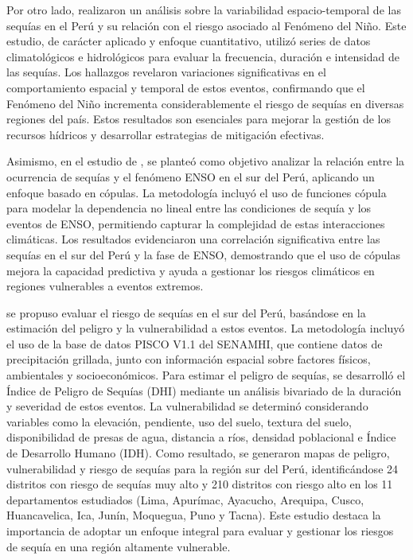 Por otro lado, \textcite{Cabrera2021} realizaron un análisis sobre la variabilidad espacio-temporal de las sequías en el Perú y su relación con el riesgo asociado al Fenómeno del Niño. Este estudio, de carácter aplicado y enfoque cuantitativo, utilizó series de datos climatológicos e hidrológicos para evaluar la frecuencia, duración e intensidad de las sequías. Los hallazgos revelaron variaciones significativas en el comportamiento espacial y temporal de estos eventos, confirmando que el Fenómeno del Niño incrementa considerablemente el riesgo de sequías en diversas regiones del país. Estos resultados son esenciales para mejorar la gestión de los recursos hídricos y desarrollar estrategias de mitigación efectivas.

Asimismo, en el estudio de \textcite{Cabrera2019}, se planteó como objetivo analizar la relación entre la ocurrencia de sequías y el fenómeno ENSO en el sur del Perú, aplicando un enfoque basado en cópulas. La metodología incluyó el uso de funciones cópula para modelar la dependencia no lineal entre las condiciones de sequía y los eventos de ENSO, permitiendo capturar la complejidad de estas interacciones climáticas. Los resultados evidenciaron una correlación significativa entre las sequías en el sur del Perú y la fase de ENSO, demostrando que el uso de cópulas mejora la capacidad predictiva y ayuda a gestionar los riesgos climáticos en regiones vulnerables a eventos extremos.

\textcite{Vega2016} se propuso evaluar el riesgo de sequías en el sur del Perú, basándose en la estimación del peligro y la vulnerabilidad a estos eventos. La metodología incluyó el uso de la base de datos PISCO V1.1 del SENAMHI, que contiene datos de precipitación grillada, junto con información espacial sobre factores físicos, ambientales y socioeconómicos. Para estimar el peligro de sequías, se desarrolló el Índice de Peligro de Sequías (DHI) mediante un análisis bivariado de la duración y severidad de estos eventos. La vulnerabilidad se determinó considerando variables como la elevación, pendiente, uso del suelo, textura del suelo, disponibilidad de presas de agua, distancia a ríos, densidad poblacional e Índice de Desarrollo Humano (IDH). Como resultado, se generaron mapas de peligro, vulnerabilidad y riesgo de sequías para la región sur del Perú, identificándose 24 distritos con riesgo de sequías muy alto y 210 distritos con riesgo alto en los 11 departamentos estudiados (Lima, Apurímac, Ayacucho, Arequipa, Cusco, Huancavelica, Ica, Junín, Moquegua, Puno y Tacna). Este estudio destaca la importancia de adoptar un enfoque integral para evaluar y gestionar los riesgos de sequía en una región altamente vulnerable.


